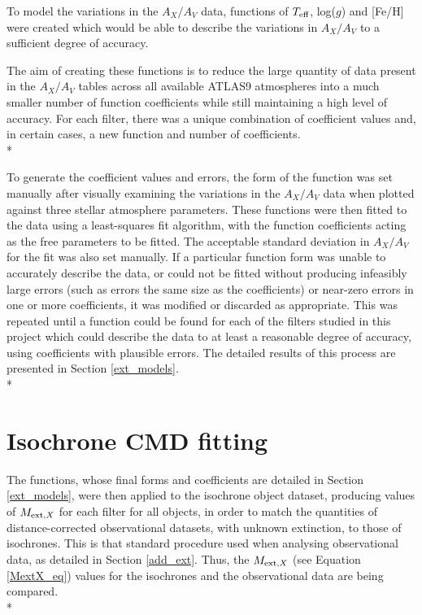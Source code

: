 \documentclass[12pt, a4paper]{report}
\begin{document}
To model the variations in the $A_{X}/A_{V}$ data, functions of $T_{\textnormal{eff}}$, log($g$) and [Fe/H] were created which would be able to describe the variations in $A_{X}/A_{V}$ to a sufficient degree of accuracy. 


The aim of creating these functions is to reduce the large quantity of data present in the $A_{X}/A_{V}$ tables across all available ATLAS9 atmospheres into a much smaller number of function coefficients while still maintaining a high level of accuracy. For each filter, there was a unique combination of coefficient values and, in certain cases, a new function and number of coefficients.\\*


To generate the coefficient values and errors, the form of the function was set manually after visually examining the variations in the $A_{X}/A_{V}$ data when plotted against three stellar atmosphere parameters. These functions were then fitted to the data using a least-squares fit algorithm, with the function coefficients acting as the free parameters to be fitted. The acceptable standard deviation in $A_{X}/A_{V}$ for the fit was also set manually. If a particular function form was unable to accurately describe the data, or could not be fitted without producing infeasibly large errors (such as errors the same size as the coefficients) or near-zero errors in one or more coefficients, it was modified or discarded as appropriate. This was repeated until a function could be found for each of the filters studied in this project which could  describe the data to at least a reasonable degree of accuracy, using coefficients with plausible errors. The detailed results of this process are presented in Section \ref{ext_models}.\\*

\section{Isochrone CMD fitting} \label{isoc_fit} 

The functions, whose final forms and coefficients are detailed in Section \ref{ext_models}, were then applied to the isochrone object dataset, producing values of $M_{\textnormal{ext},X}$ for each filter for all objects, in order to match the quantities of distance-corrected observational datasets, with unknown extinction, to those of isochrones. This is that standard procedure used when analysing observational data, as detailed in Section \ref{add_ext}. Thus, the $M_{\textnormal{ext},X}$ (see Equation \ref{MextX_eq}) values for the isochrones and the observational data are being compared.\\*
\end{document}
